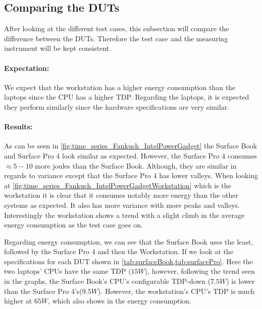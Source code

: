 


\subsection{Comparing the DUTs}
After looking at the different test cases, this subsection will compare the difference between the DUTs. Therefore the test case and the measuring instrument will be kept consistent. 

\paragraph{Expectation:}
We expect that the workstation has a higher energy consumption than the laptops since the CPU has a higher TDP. Regarding the laptops, it is expected they perform similarly since the hardware specifications are very similar.

\paragraph{Results:}
As can be seen in \cref{fig:time_series_Fankuch_IntelPowerGadget} the Surface Book and Surface Pro 4 look similar as expected. However, the Surface Pro 4 consumes $\approx5-10$ more joules than the Surface Book. Although, they are similar in regards to variance except that the Surface Pro 4 has lower valleys. When looking at \cref{fig:time_series_Fankuch_IntelPowerGadgetWorkstation} which is the workstation it is clear that it consumes notably more energy than the other systems as expected. It also has more variance with more peaks and valleys. Interestingly the workstation shows a trend with a slight climb in the average energy consumption as the test case goes on.



Regarding energy consumption, we can see that the Surface Book uses the least, followed by the Surface Pro 4 and then the Workstation. If we look at the specifications for each DUT shown in \cref{tab:surfaceBook,tab:surfacePro}. Here the two laptops' CPUs have the same TDP ($15W$), however, following the trend seen in the graphs, the Surface Book's CPU's configurable TDP-down ($7.5W$) is lower than the Surface Pro 4's($9.5W$). However, the workstation's CPU's TDP is much higher at $65W$, which also shows in the energy consumption. %

